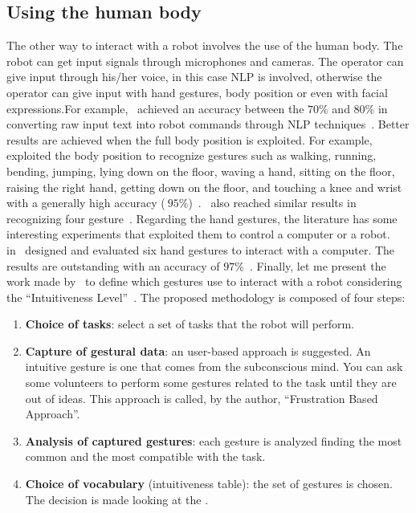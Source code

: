 \documentclass[../thesis.tex]{subfiles}
\begin{document}
\subsection{Using the human body}
The other way to interact with a robot involves the use of the human body. The robot can get input signals through microphones and cameras. The operator can give input through his/her voice, in this case \acrfull{NLP} is involved, otherwise the operator can give input with hand gestures, body position or even with facial expressions.For example,~\citeauthor{paper:commanding_a_robot_with_NLP} achieved an accuracy between the $70\%$ and $80\%$ in converting raw input text into robot commands through \acrshort{NLP} techniques~\cite{paper:commanding_a_robot_with_NLP}. Better results are achieved when the full body position is exploited. For example, \citeauthor{paper:example_full_body_gesture1} exploited the body position to recognize gestures such as walking, running, bending, jumping, lying down on the floor, waving a hand, sitting on the floor, raising the right hand, getting down on the floor, and touching a knee and wrist with a generally high accuracy ($~95\%$)~\cite{paper:example_full_body_gesture1}.~\citeauthor{paper:example_full_body_gesture2} also reached similar results in~\citeyear{paper:example_full_body_gesture2} recognizing four gesture~\cite{paper:example_full_body_gesture2}. Regarding the hand gestures, the literature has some interesting experiments that exploited them to control a computer or a robot.~\citeauthor{paper:design_and_evaluate_hand_gesture} in~\citeyear{paper:design_and_evaluate_hand_gesture} designed and evaluated six hand gestures to interact with a computer. The results are outstanding with an accuracy of $97\%$~\cite{paper:design_and_evaluate_hand_gesture}. Finally, let me present the work made by~\citeauthor{paper:intuitiveness_level} to define which gestures use to interact with a robot considering the ``Intuitiveness Level''~\cite{paper:intuitiveness_level}. The proposed methodology is composed of four steps:
\begin{enumerate}
    \item \textbf{Choice of tasks}: select a set of tasks that the robot will perform.
    \item \textbf{Capture of gestural data}: an user-based approach is suggested. An intuitive gesture is one that comes from the subconscious mind. You can ask some volunteers to perform some gestures related to the task until they are out of ideas. This approach is called, by the author, ``Frustration Based Approach''.
    \item \textbf{Analysis of captured gestures}: each gesture is analyzed finding the most common and the most compatible with the task.
    \item \textbf{Choice of vocabulary} (intuitiveness table): the set of gestures is chosen. The decision is made looking at the .
\end{enumerate}
\end{document}
